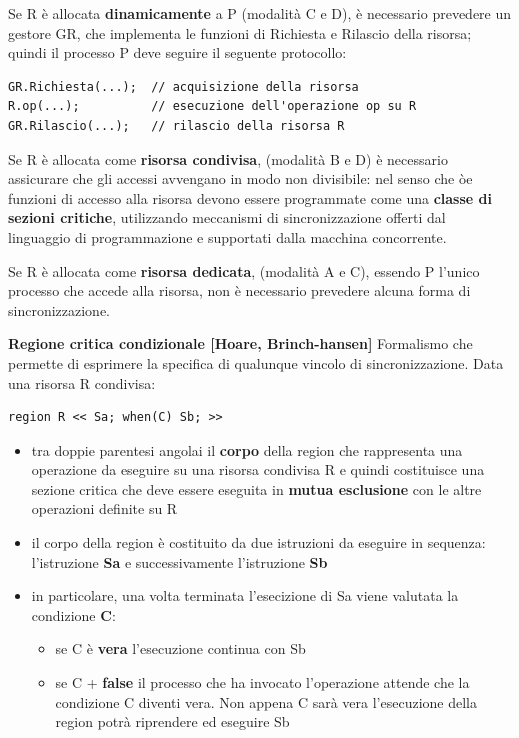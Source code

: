 \documentclass{article}
\begin{document}
Se R è allocata \textbf{dinamicamente} a P (modalità C e D), è necessario prevedere un gestore GR, che implementa le funzioni di Richiesta e Rilascio della risorsa; quindi il
processo P deve seguire il seguente protocollo:

\vspace{3mm}
\begin{lstlisting}
GR.Richiesta(...);  // acquisizione della risorsa
R.op(...);          // esecuzione dell'operazione op su R
GR.Rilascio(...);   // rilascio della risorsa R
\end{lstlisting}

\vspace{3mm}
Se R è allocata come \textbf{risorsa condivisa}, (modalità B e D) è necessario assicurare che gli accessi avvengano in modo non divisibile: nel senso che òe funzioni di accesso alla
risorsa devono essere programmate come una \textbf{classe di sezioni critiche}, utilizzando meccanismi di sincronizzazione offerti dal linguaggio di programmazione e supportati
dalla macchina concorrente.

\vspace{3mm}
Se R è allocata come \textbf{risorsa dedicata}, (modalità A e C), essendo P l'unico processo che accede alla risorsa, non è necessario prevedere alcuna forma di sincronizzazione.

\vspace{5mm}
{\large \textbf{Regione critica condizionale [Hoare, Brinch-hansen]}}
Formalismo che permette di esprimere la specifica di qualunque vincolo di sincronizzazione. Data una risorsa R condivisa:

\begin{lstlisting}
region R << Sa; when(C) Sb; >>
\end{lstlisting}

\begin{itemize}
    \item tra doppie parentesi angolai il \textbf{corpo} della region che rappresenta una operazione da eseguire su una risorsa condivisa R e quindi costituisce una sezione critica
    che deve essere eseguita in \textbf{mutua esclusione} con le altre operazioni definite su R
    \item il corpo della region è costituito da due istruzioni da eseguire in sequenza: l'istruzione \textbf{Sa} e successivamente l'istruzione \textbf{Sb}
    \item in particolare, una volta terminata l'esecizione di Sa viene valutata la condizione \textbf{C}:
    \begin{itemize}
        \item se C è \textbf{vera} l'esecuzione continua con Sb
        \item se C + \textbf{false} il processo che ha invocato l'operazione attende che la condizione C diventi vera. Non appena C sarà vera l'esecuzione della region potrà riprendere
        ed eseguire Sb
    \end{itemize}
\end{itemize}
\end{document}

